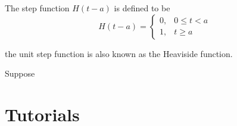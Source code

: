 \begin{definition}
    The step function $H(t - a)$ is defined to be
    \begin{equation}
        H(t - a) = \begin{cases}
            0, & 0 \leq t < a\\
            1, & t \geq a
        \end{cases}
    \end{equation}

    the unit step function is also known as the Heaviside function.
\end{definition}

\begin{theorem}
    Suppose     
\end{theorem}

\section{Tutorials}

